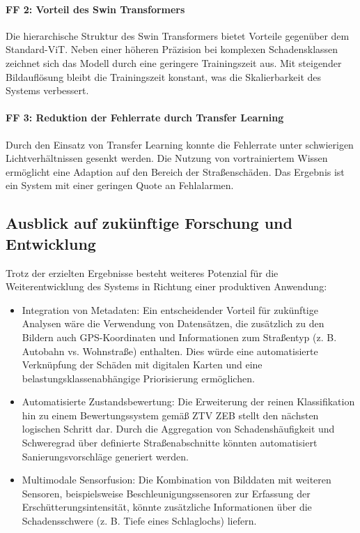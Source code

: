 \paragraph{FF 2: Vorteil des Swin Transformers}
Die hierarchische Struktur des Swin Transformers bietet Vorteile gegenüber dem Standard-ViT. Neben einer höheren Präzision bei komplexen Schadensklassen zeichnet sich das Modell durch eine geringere Trainingszeit aus. Mit steigender Bildauflösung bleibt die Trainingszeit konstant, was die Skalierbarkeit des Systems verbessert.

\paragraph{FF 3: Reduktion der Fehlerrate durch Transfer Learning}
Durch den Einsatz von Transfer Learning konnte die Fehlerrate unter schwierigen Lichtverhältnissen gesenkt werden. Die Nutzung von vortrainiertem Wissen ermöglicht eine Adaption auf den Bereich der Straßenschäden. Das Ergebnis ist ein System mit einer geringen Quote an Fehlalarmen.

\subsection{Ausblick auf zukünftige Forschung und Entwicklung}
\label{subsec:ausblick}

Trotz der erzielten Ergebnisse besteht weiteres Potenzial für die Weiterentwicklung des Systems in Richtung einer produktiven Anwendung:
\begin{itemize}
    \item Integration von Metadaten: Ein entscheidender Vorteil für zukünftige Analysen wäre die Verwendung von Datensätzen, die zusätzlich zu den Bildern auch GPS-Koordinaten und Informationen zum Straßentyp (z. B. Autobahn vs. Wohnstraße) enthalten. Dies würde eine automatisierte Verknüpfung der Schäden mit digitalen Karten und eine belastungsklassenabhängige Priorisierung ermöglichen.
    \item Automatisierte Zustandsbewertung: Die Erweiterung der reinen Klassifikation hin zu einem Bewertungssystem gemäß ZTV ZEB stellt den nächsten logischen Schritt dar. Durch die Aggregation von Schadenshäufigkeit und Schweregrad über definierte Straßenabschnitte könnten automatisiert Sanierungsvorschläge generiert werden.
    \item Multimodale Sensorfusion: Die Kombination von Bilddaten mit weiteren Sensoren, beispielsweise Beschleunigungssensoren zur Erfassung der Erschütterungsintensität, könnte zusätzliche Informationen über die Schadensschwere (z. B. Tiefe eines Schlaglochs) liefern.
\end{itemize}

